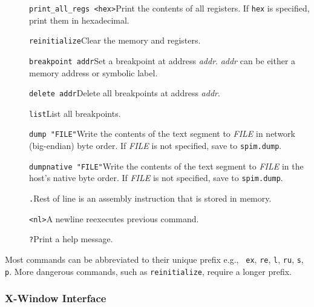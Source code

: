 \documentclass[11pt]{article}
\begin{document}
\begin{description}
  \item [] {\tt print\_all\_regs <hex>}\newline Print the contents of all
registers.  If {\tt hex} is specified, print them in hexadecimal.

  \item [] {\tt reinitialize}\newline Clear the memory and registers.

  \item [] {\tt breakpoint addr}\newline Set a breakpoint at address
{\em addr\/}.  {\em addr\/} can be either a memory address or symbolic
label.

  \item [] {\tt delete addr}\newline Delete all breakpoints at address
{\em addr\/}.

  \item [] {\tt list}\newline List all breakpoints.

  \item [] {\tt dump "FILE"}\newline Write the contents of the text
segment to {\em FILE} in network (big-endian) byte order.  If {\em FILE}
is not specified, save to {\tt spim.dump}.

  \item [] {\tt dumpnative "FILE"}\newline Write the contents of the text
segment to {\em FILE} in the host's native byte order.  If {\em FILE}
is not specified, save to {\tt spim.dump}.

  \item [] {\tt .}\newline Rest of line is an assembly instruction
that is stored in memory.

  \item [] {\tt <nl>}\newline A newline reexecutes previous command.

  \item [] {\tt ?}\newline Print a help message.
\end{description}

Most commands can be abbreviated to their unique prefix e.g., {\tt
ex}, {\tt re}, {\tt l}, {\tt ru}, {\tt s}, {\tt p}.  More dangerous
commands, such as {\tt reinitialize}, require a longer prefix.

\subsubsection{X-Window Interface}
\end{document}
